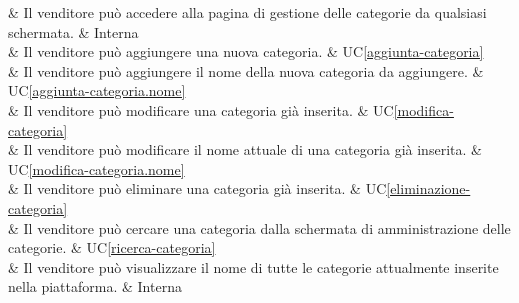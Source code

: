  & Il venditore può accedere alla pagina di gestione delle categorie da qualsiasi schermata. & Interna \\

 & Il venditore può aggiungere una nuova categoria. & UC\ref{aggiunta-categoria} \\
    
 & Il venditore può aggiungere il nome della nuova categoria da aggiungere. & UC\ref{aggiunta-categoria.nome} \\
    
 & Il venditore può modificare una categoria già inserita. & UC\ref{modifica-categoria} \\
    
 & Il venditore può modificare il nome attuale di una categoria già inserita. & UC\ref{modifica-categoria.nome} \\

 & Il venditore può eliminare una categoria già inserita. & UC\ref{eliminazione-categoria} \\

 & Il venditore può cercare una categoria dalla schermata di amministrazione delle categorie. & UC\ref{ricerca-categoria} \\

 & Il venditore può visualizzare il nome di tutte le categorie attualmente inserite nella piattaforma. & Interna \\

